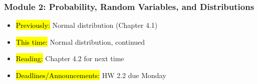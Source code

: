 
\begin{frame}
    \frametitle{Module 2: Probability, Random Variables, and Distributions}
    \begin{itemize}
        \item \hl{Previously: } Normal distribution (Chapter 4.1)
        \item \hl{This time: } Normal distribution, continued
        \item \hl{Reading: } Chapter 4.2 for next time
        \item \hl{Deadlines/Announcements: } HW 2.2 due Monday
    \end{itemize}
    
\end{frame}
    